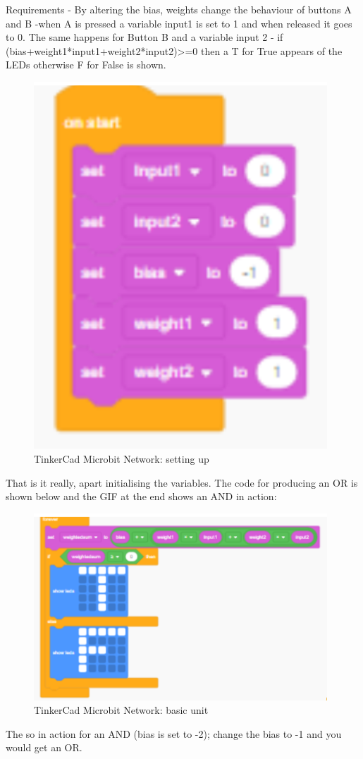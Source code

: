 Requirements 
- By altering the bias, weights change the behaviour of buttons A and B
-when A is pressed a variable input1 is set to 1 and when released it goes to 0. The same happens for Button B and a variable input 2
- if (bias+weight1*input1+weight2*input2)>=0 then a T for True appears of the LEDs otherwise F for False is shown.
\begin{figure}
    \centering
    \includegraphics[width=11cm]{chapters/chAi1/figures/Tinkercadann2.png}
    \caption{TinkerCad Microbit Network: setting up}
    \label{fig:tinkercad_neural_microbit_network_basic}
\end{figure}
That is it really, apart initialising the variables. The code for producing an OR is shown below and the GIF at the end shows an AND in action:
\begin{figure}
    \centering
    \includegraphics[width=11cm]{chapters/chAi1/figures/Tinkercadann23.png}
    \caption{TinkerCad Microbit Network: basic unit}
    \label{fig:tinkercad_neural_microbit_network_basic2}
\end{figure}
The so in action for an AND (bias is set to -2); change the bias to -1 and you would get an OR.

